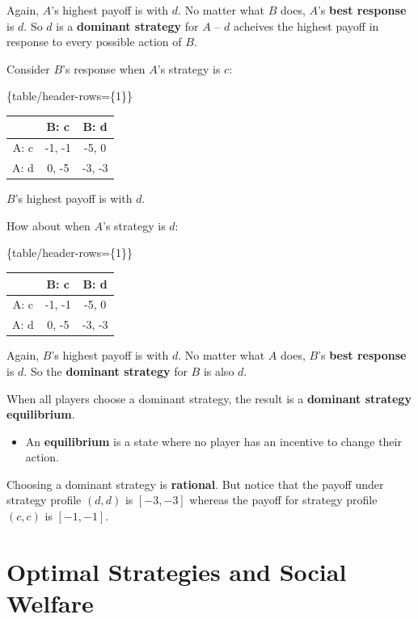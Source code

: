 \documentclass[11pt]{article}
\begin{document}
Again, \(A\)'s highest payoff is with \(d\).  No matter what \(B\) does, \(A\)'s \textbf{best response} is \(d\).  So \(d\) is a \textbf{dominant strategy} for \(A\) -- \(d\) acheives the highest payoff in response to every possible action of \(B\).




Consider \(B\)'s response when \(A\)'s strategy is \(c\):


\tagpdfsetup\{table/header-rows=\{1\}\}
\begin{tabular}{|c|c|c|}\hline
       & B: c         & B: d                                      \\\hline
A: c & \cellcolor{lightgray} -1, -1  & \cellcolor{lightgray} -5, 0 \\\hline
A: d & 0, -5                         & -3, -3                      \\\hline
\end{tabular}


\(B\)'s highest payoff is with \(d\).

How about when \(A\)'s strategy is \(d\):


\tagpdfsetup\{table/header-rows=\{1\}\}
\begin{tabular}{|c|c|c|}\hline
       & B: c         & B: d                                      \\\hline
A: c & -1, -1                      & -5, 0                         \\\hline
A: d & \cellcolor{lightgray} 0, -5 & \cellcolor{lightgray}-3, -3   \\\hline
\end{tabular}


Again, \(B\)'s highest payoff is with \(d\).  No matter what \(A\) does, \(B\)'s \textbf{best response} is \(d\).  So the \textbf{dominant strategy} for \(B\) is also \(d\).




When all players choose a dominant strategy, the result is a \textbf{dominant strategy equilibrium}.

\begin{itemize}
\item An \textbf{equilibrium} is a state where no player has an incentive to change their action.
\end{itemize}

Choosing a dominant strategy is \textbf{rational}.  But notice that the payoff under strategy profile \((d, d)\) is \([-3, -3]\) whereas the payoff for strategy profile \((c, c)\) is \([-1, -1]\).
\section{Optimal Strategies and Social Welfare}
\label{sec:org7e81703}
\end{document}
